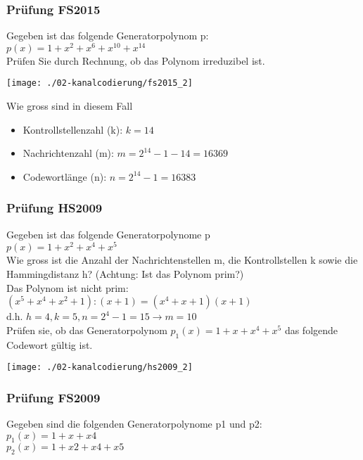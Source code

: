 \subsubsection{Prüfung FS2015}
Gegeben ist das folgende Generatorpolynom p:\\
$p(x)=1+x^2+x^6+x^{10}+x^{14}$\\

Prüfen Sie durch Rechnung, ob das Polynom irreduzibel ist.
\begin{center}
    \vspace{-8pt}
    \texttt{[image: ./02-kanalcodierung/fs2015\_2]}
    \vspace{-8pt}
\end{center}

Wie gross sind in diesem Fall
\begin{itemize}
    \item Kontrollstellenzahl (k): $k=14$
    \item Nachrichtenzahl (m): $m=2^{14}-1-14=16369$
    \item Codewortlänge (n): $n=2^{14}-1=16383$
\end{itemize}

\subsubsection{Prüfung HS2009}
Gegeben ist das folgende Generatorpolynome p\\
$p(x)=1+x^2+x^4+x^5$\\

Wie gross ist die Anzahl der Nachrichtenstellen m, die Kontrollstellen k sowie die Hammingdistanz h? (Achtung: Ist das Polynom prim?)\\
Das Polynom ist nicht prim:\\
$(x^5+x^4+x^2+1):(x+1)=(x^4+x+1)(x+1)$\\
d.h. $h=4,k=5,n=2^4-1=15 \rightarrow m=10$\\

Prüfen sie, ob das Generatorpolynom $p_1(x)=1+x+x^4+x^5$ das folgende Codewort gültig ist.\\
\begin{center}
    \vspace{-8pt}
    \texttt{[image: ./02-kanalcodierung/hs2009\_2]}
    \vspace{-8pt}
\end{center}

\subsubsection{Prüfung FS2009}
Gegeben sind die folgenden Generatorpolynome p1 und p2:\\
$p_1(x)=1+x+x4$\\
$p_2(x)=1+x2+x4+x5$\\


